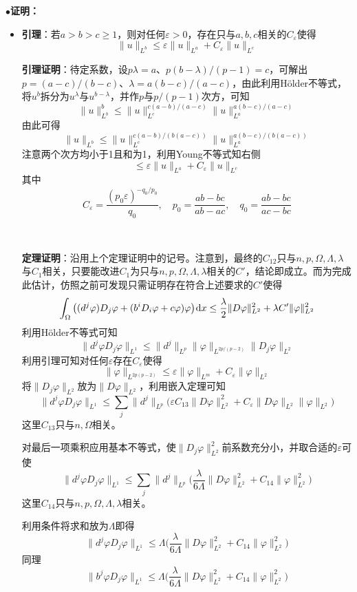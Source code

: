\documentclass[a4paper,UTF8,fontset=windows,AutoFakeBold]{ctexart}
\newcommand*{\dr}{\hspace{0.07em}\mathrm{d}}
\newcommand{\proo}[1]{{\kaishu $\bullet$\textbf{证明：}
\begin{itemize}
    \item[] #1
\end{itemize}
}}
\begin{document}
\proo{
    \textbf{引理}：若$a>b>c\ge1$，则对任何$\varepsilon>0$，存在只与$a,b,c$相关的$C_\varepsilon$使得
    $$\|u\|_{L^b}\le\varepsilon\|u\|_{L^a}+C_\varepsilon\|u\|_{L^c}$$
    
    \textbf{引理证明}：待定系数，设$p\lambda=a$、$p(b-\lambda)/(p-1)=c$，可解出$p=(a-c)/(b-c)$、$\lambda=a(b-c)/(a-c)$，由此利用H\"older不等式，将$u^b$拆分为$u^\lambda$与$u^{b-\lambda}$，并作$p$与$p/(p-1)$次方，可知
    $$\|u\|_{L^b}^b\le\|u\|_{L^c}^{c(a-b)/(a-c)}\|u\|_{L^a}^{a(b-c)/(a-c)}$$
    由此可得
    $$\|u\|_{L^b}\le\|u\|_{L^c}^{c(a-b)/(b(a-c))}\|u\|_{L^a}^{a(b-c)/(b(a-c))}$$
    注意两个次方均小于1且和为1，利用Young不等式知右侧
    $$\le\varepsilon\|u\|_{L^a}+C_\varepsilon\|u\|_{L^c}$$
    其中
    $$C_\varepsilon=\frac{(p_0\varepsilon)^{-q_0/p_0}}{q_0},\quad p_0=\frac{ab-bc}{ab-ac},\quad q_0=\frac{ab-bc}{ac-bc}$$

    \

    \textbf{定理证明}：沿用上个定理证明中的记号。注意到，最终的$C_{12}$只与$n,p,\Omega,\Lambda,\lambda$与$C_1$相关，只要能改进$C_1$为只与$n,p,\Omega,\Lambda,\lambda$相关的$C'$，结论即成立。而为完成此估计，仿照之前可发现只需证明存在符合上述要求的$C'$使得
    $$\int_\Omega\big((d^j\varphi)D_j\varphi+(b^iD_i\varphi+c\varphi)\varphi\big)\dr x\le\frac{\lambda}{2}\|D\varphi\|_{L^2}^2+\lambda C'\|\varphi\|_{L^2}^2$$
    利用H\"older不等式可知
    $$\|d^j\varphi D_j\varphi\|_{L^1}\le\|d^j\|_{L^p}\|\varphi\|_{L^{2p/(p-2)}}\|D_j\varphi\|_{L^2}$$
    利用引理可知对任何$\varepsilon$存在$C_\varepsilon$使得
    $$\|\varphi\|_{L^{2p(p-2)}}\le\varepsilon\|\varphi\|_{L^m}+C_\varepsilon\|\varphi\|_{L^2}$$
    将$\|D_j\varphi\|_{L^2}$放为$\|D\varphi\|_{L^2}$，利用嵌入定理可知
    $$\|d^j\varphi D_j\varphi\|_{L^1}\le\sum_j\|d^j\|_{L^p}\big(\varepsilon C_{13}\|D\varphi\|_{L^2}^2+C_\varepsilon\|D\varphi\|_{L^2}\|\varphi\|_{L^2}\big)$$
    这里$C_{13}$只与$n,\Omega$相关。

    对最后一项乘积应用基本不等式，使$\|D_j\varphi\|_{L^2}^2$前系数充分小，并取合适的$\varepsilon$可使
    $$\|d^j\varphi D_j\varphi\|_{L^1}\le\sum_j\|d^j\|_{L^p}\bigg(\frac{\lambda}{6\Lambda}\|D\varphi\|_{L^2}^2+C_{14}\|\varphi\|_{L^2}^2\bigg)$$
    这里$C_{14}$只与$n,p,\Omega,\Lambda,\lambda$相关。

    利用条件将求和放为$\Lambda$即得
    $$\|d^j\varphi D_j\varphi\|_{L^1}\le\Lambda\bigg(\frac{\lambda}{6\Lambda}\|D\varphi\|_{L^2}^2+C_{14}\|\varphi\|_{L^2}^2\bigg)$$
    同理
    $$\|b^j\varphi D_j\varphi\|_{L^1}\le\Lambda\bigg(\frac{\lambda}{6\Lambda}\|D\varphi\|_{L^2}^2+C_{14}\|\varphi\|_{L^2}^2\bigg)$$
    
}
\end{document}
